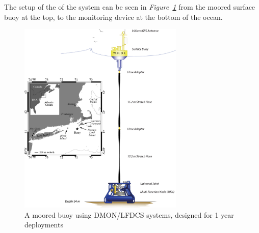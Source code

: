The setup of the of the system can be seen in \textit{Figure~\ref{fig:DMON/LFDCS}} from the moored surface buoy at the top, to the monitoring device at the bottom of the ocean.

\begin{figure}[h]
    \centering
    \includegraphics[width=0.70\textwidth]{graphics/DMONbuoy.jpg}
    \caption{A moored buoy using DMON/LFDCS systems, designed for 1 year deployments\cite{baumgartner_persistent_2019}}
    \label{fig:DMON/LFDCS}
\end{figure}




